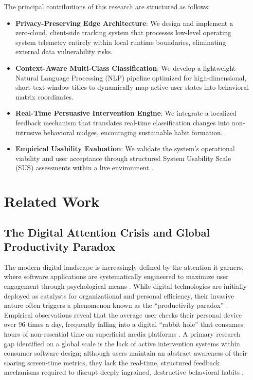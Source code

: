 \documentclass[conference]{IEEEtran}
\begin{document}
The principal contributions of this research are structured as follows:
\begin{itemize}
    \item \textbf{Privacy-Preserving Edge Architecture}: We design and implement a zero-cloud, client-side tracking system that processes low-level operating system telemetry entirely within local runtime boundaries, eliminating external data vulnerability risks.
    \item \textbf{Context-Aware Multi-Class Classification}: We develop a lightweight Natural Language Processing (NLP) pipeline optimized for high-dimensional, short-text window titles to dynamically map active user states into behavioral matrix coordinates.
    \item \textbf{Real-Time Persuasive Intervention Engine}: We integrate a localized feedback mechanism that translates real-time classification changes into non-intrusive behavioral nudges, encouraging sustainable habit formation.
    \item \textbf{Empirical Usability Evaluation}: We validate the system's operational viability and user acceptance through structured System Usability Scale (SUS) assessments within a live environment \cite{Bangor2008, Sauro2016}.
\end{itemize}

\section{Related Work}

\subsection{The Digital Attention Crisis and Global Productivity Paradox}
The modern digital landscape is increasingly defined by the attention it garners, where software applications are systematically engineered to maximize user engagement through psychological means \cite{CenterForHumaneTechnology2024, Mark2023}. While digital technologies are initially deployed as catalysts for organizational and personal efficiency, their invasive nature often triggers a phenomenon known as the ``productivity paradox'' \cite{Abhari2022}. Empirical observations reveal that the average user checks their personal device over 96 times a day, frequently falling into a digital ``rabbit hole'' that consumes hours of non-essential time on superficial media platforms \cite{Newport2019}. A primary research gap identified on a global scale is the lack of active intervention systems within consumer software design; although users maintain an abstract awareness of their soaring screen-time metrics, they lack the real-time, structured feedback mechanisms required to disrupt deeply ingrained, destructive behavioral habits \cite{Thaler2021, Fogg2009}.
\end{document}
